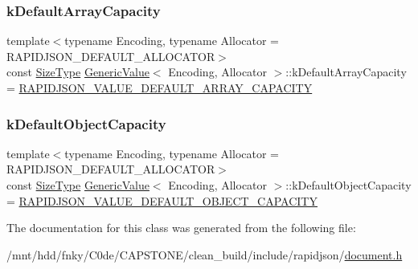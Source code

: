 \subsubsection{\texorpdfstring{k\+Default\+Array\+Capacity}{kDefaultArrayCapacity}}
{\footnotesize\ttfamily template$<$typename Encoding, typename Allocator = R\+A\+P\+I\+D\+J\+S\+O\+N\+\_\+\+D\+E\+F\+A\+U\+L\+T\+\_\+\+A\+L\+L\+O\+C\+A\+T\+OR$>$ \\
const \hyperlink{rapidjson_8h_a5ed6e6e67250fadbd041127e6386dcb5}{Size\+Type} \hyperlink{classGenericValue}{Generic\+Value}$<$ Encoding, Allocator $>$\+::k\+Default\+Array\+Capacity = \hyperlink{group__RAPIDJSON__CONFIG_ga10ba0ee06d0ac2803d0f2290d46b19f7}{R\+A\+P\+I\+D\+J\+S\+O\+N\+\_\+\+V\+A\+L\+U\+E\+\_\+\+D\+E\+F\+A\+U\+L\+T\+\_\+\+A\+R\+R\+A\+Y\+\_\+\+C\+A\+P\+A\+C\+I\+TY}\hspace{0.3cm}{\ttfamily [static]}}

\mbox{\label{classGenericValue_a284d018914629aed9a4bd97fe2dc5899}} 
\subsubsection{\texorpdfstring{k\+Default\+Object\+Capacity}{kDefaultObjectCapacity}}
{\footnotesize\ttfamily template$<$typename Encoding, typename Allocator = R\+A\+P\+I\+D\+J\+S\+O\+N\+\_\+\+D\+E\+F\+A\+U\+L\+T\+\_\+\+A\+L\+L\+O\+C\+A\+T\+OR$>$ \\
const \hyperlink{rapidjson_8h_a5ed6e6e67250fadbd041127e6386dcb5}{Size\+Type} \hyperlink{classGenericValue}{Generic\+Value}$<$ Encoding, Allocator $>$\+::k\+Default\+Object\+Capacity = \hyperlink{group__RAPIDJSON__CONFIG_ga5c88aa612939b592d15d3fc4bdf54272}{R\+A\+P\+I\+D\+J\+S\+O\+N\+\_\+\+V\+A\+L\+U\+E\+\_\+\+D\+E\+F\+A\+U\+L\+T\+\_\+\+O\+B\+J\+E\+C\+T\+\_\+\+C\+A\+P\+A\+C\+I\+TY}\hspace{0.3cm}{\ttfamily [static]}}



The documentation for this class was generated from the following file\+:\begin{DoxyCompactItemize}
\item 
/mnt/hdd/fnky/\+C0de/\+C\+A\+P\+S\+T\+O\+N\+E/clean\+\_\+build/include/rapidjson/\hyperlink{document_8h}{document.\+h}\end{DoxyCompactItemize}
